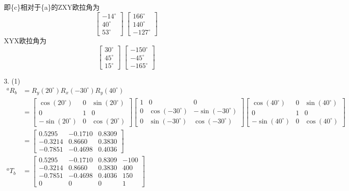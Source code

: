 \documentclass[UTF8, 12pt]{ctexart}
\begin{document}
即\{c\}相对于\{a\}的ZXY欧拉角为
\[
\begin{bmatrix}
    -14^\circ \\ 40^\circ \\ 53^\circ
\end{bmatrix} \;
\begin{bmatrix}
    166^\circ \\ 140^\circ \\ -127^\circ
\end{bmatrix}
\]
XYX欧拉角为
\[
\begin{bmatrix}
    30^\circ \\ 45^\circ \\ 15^\circ
\end{bmatrix} \;
\begin{bmatrix}
    -150^\circ \\ -45^\circ \\ -165^\circ
\end{bmatrix}
\]

\newpage

3.
(1)
\[
\begin{aligned}
    {}^a R_b &= R_y(20^\circ) R_x(-30^\circ) R_y(40^\circ) \\
            &=
            \begin{bmatrix}
                \cos(20^\circ) & 0 & \sin(20^\circ) \\
                0 & 1 & 0 \\
                -\sin(20^\circ) & 0 & \cos(20^\circ)
            \end{bmatrix}
            \begin{bmatrix}
                1 & 0 & 0 \\
                0 & \cos(-30^\circ) & -\sin(-30^\circ) \\
                0 & \sin(-30^\circ) & \cos(-30^\circ)
            \end{bmatrix}
            \begin{bmatrix}
                \cos(40^\circ) & 0 & \sin(40^\circ) \\
                0 & 1 & 0 \\
                -\sin(40^\circ) & 0 & \cos(40^\circ)
            \end{bmatrix} \\
            &=
            \begin{bmatrix}
                0.5295 & -0.1710 &  0.8309 \\
                -0.3214 &  0.8660 &  0.3830 \\
                -0.7851 & -0.4698 &  0.4036
            \end{bmatrix} \\
    {}^a T_b &= 
        \begin{bmatrix}
            0.5295 & -0.1710 &  0.8309 & -100 \\
            -0.3214 &  0.8660 &  0.3830 & 400 \\
            -0.7851 & -0.4698 &  0.4036 & 150 \\
            0 & 0 & 0 & 1
        \end{bmatrix}
\end{aligned}
\]
\vspace{5em}
\end{document}
